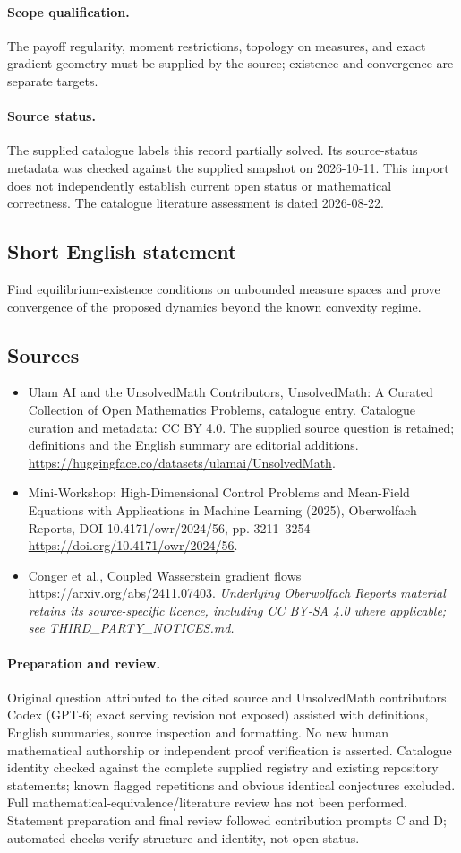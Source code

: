 \documentclass[11pt]{article}
\begin{document}
\paragraph{Scope qualification.}
The payoff regularity, moment restrictions, topology on measures, and exact gradient geometry must be supplied by the source; existence and convergence are separate targets.
\paragraph{Source status.}
The supplied catalogue labels this record partially solved. Its source-status metadata was checked against the supplied snapshot on 2026-10-11. This import does not independently establish current open status or mathematical correctness. The catalogue literature assessment is dated 2026-08-22.
\subsection{Short English statement}
Find equilibrium-existence conditions on unbounded measure spaces and prove convergence of the proposed dynamics beyond the known convexity regime.
\subsection{Sources}
\begin{itemize}
\item[S1] Ulam AI and the UnsolvedMath Contributors, UnsolvedMath: A Curated Collection of Open Mathematics Problems, catalogue entry. Catalogue curation and metadata: CC BY 4.0. The supplied source question is retained; definitions and the English summary are editorial additions.
\url{https://huggingface.co/datasets/ulamai/UnsolvedMath}.
\item[S2] Mini-Workshop: High-Dimensional Control Problems and Mean-Field Equations with Applications in Machine Learning (2025), Oberwolfach Reports, DOI 10.4171/owr/2024/56, pp. 3211--3254
\url{https://doi.org/10.4171/owr/2024/56}.
\item[S3] Conger et al., Coupled Wasserstein gradient flows
\url{https://arxiv.org/abs/2411.07403}.
\textit{Underlying Oberwolfach Reports material retains its source-specific licence, including CC BY-SA 4.0 where applicable; see THIRD\_PARTY\_NOTICES.md.}
\end{itemize}
\paragraph{Preparation and review.}
Original question attributed to the cited source and UnsolvedMath contributors. Codex (GPT-6; exact serving revision not exposed) assisted with definitions, English summaries, source inspection and formatting. No new human mathematical authorship or independent proof verification is asserted. Catalogue identity checked against the complete supplied registry and existing repository statements; known flagged repetitions and obvious identical conjectures excluded. Full mathematical-equivalence/literature review has not been performed. Statement preparation and final review followed contribution prompts C and D; automated checks verify structure and identity, not open status.
\label{end:statement}
\end{document}
